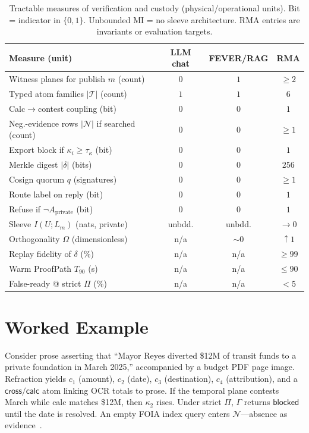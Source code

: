 \documentclass[journal,10pt,twocolumn,a4paper]{IEEEtran}
\begin{document}
\begin{table}[!t]
\centering
\caption{Tractable measures of verification and custody (physical/operational units).
Bit = indicator in $\{0,1\}$. Unbounded MI = no sleeve architecture. RMA entries are invariants or evaluation targets.}
\label{tab:compare}
\renewcommand{\arraystretch}{1.12}
\setlength{\tabcolsep}{3.5pt}
\begin{tabular}{@{}p{4.6cm}ccc@{}}
\toprule
Measure (unit) & LLM chat & FEVER/RAG & RMA \\
\midrule
Witness planes for publish $m$ (count) & $0$ & $1$ & $\ge 2$ \\
Typed atom families $|\mathcal{T}|$ (count) & $1$ & $1$ & $6$ \\
Calc$\to$contest coupling (bit) & $0$ & $0$ & $1$ \\
Neg.-evidence rows $|\mathcal{N}|$ if searched (count) & $0$ & $0$ & $\ge 1$ \\
Export block if $\kappa_i\ge\tau_\kappa$ (bit) & $0$ & $0$ & $1$ \\
Merkle digest $|\delta|$ (bits) & $0$ & $0$ & $256$ \\
Cosign quorum $q$ (signatures) & $0$ & $0$ & $\ge 1$ \\
Route label on reply (bit) & $0$ & $0$ & $1$ \\
Refuse if $\neg A_{\mathrm{private}}$ (bit) & $0$ & $0$ & $1$ \\
Sleeve $I(U;L_m)$ (nats, private) & unbdd. & unbdd. & $\to 0$ \\
Orthogonality $\Omega$ (dimensionless) & n/a & $\sim 0$ & $\uparrow 1$ \\
Replay fidelity of $\delta$ (\%) & n/a & n/a & $\ge 99$ \\
Warm ProofPath $T_{90}$ (s) & n/a & n/a & $\le 90$ \\
False-ready @ strict $\Pi$ (\%) & n/a & n/a & $<5$ \\
\bottomrule
\end{tabular}
\end{table}

\section{Worked Example}
\label{sec:example}

Consider prose asserting that ``Mayor Reyes diverted \$12M of transit funds to a private foundation in March 2025,'' accompanied by a budget PDF page image.
Refraction yields $c_1$ (amount), $c_2$ (date), $c_3$ (destination), $c_4$ (attribution), and a $\mathsf{cross}/\mathsf{calc}$ atom linking OCR totals to prose.
If the temporal plane contests March while calc matches \$12M, then $\kappa_2$ rises.
Under strict $\Pi$, $\Gamma$ returns $\mathsf{blocked}$ until the date is resolved.
An empty FOIA index query enters $\mathcal{N}$---absence as evidence~\cite{silverman2015verification}.
\end{document}
